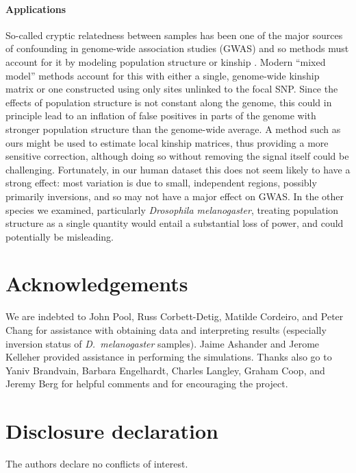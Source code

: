 \documentclass[11pt, oneside]{article}   	%
\newcommand\citep{\cite}
\renewcommand{\revpoint}[2]{\relax}
\begin{document}
\paragraph{Applications}
So-called cryptic relatedness between samples
has been one of the major sources of confounding in genome-wide association studies (GWAS)
and so methods must account for it by modeling population structure or kinship \citep{astle2009population,yang2014advantages}.
Modern ``mixed model'' methods \citep[e.g.][]{loh2015efficient} 
account for this with either a single, genome-wide kinship matrix
or one constructed using only sites unlinked to the focal SNP. %
Since the effects of population structure is not constant along the genome,
this could in principle lead to an inflation of false positives in parts of the genome
with stronger population structure than the genome-wide average.
A method such as ours might be used to estimate local kinship matrices,
thus providing a more sensitive correction,
although doing so without removing the signal itself could be challenging.
Fortunately, in our human dataset this does not seem likely to have a strong effect:
most variation is due to small, independent regions, possibly primarily inversions,
and so may not have a major effect on GWAS.
In the other species we examined, particularly \textit{Drosophila melanogaster},
treating population structure as a single quantity would entail a substantial loss of power,
and could potentially be misleading.

\section*{Acknowledgements}

We are indebted to John Pool, Russ Corbett-Detig, Matilde Cordeiro, and Peter Chang 
for assistance with obtaining data and interpreting results
(especially inversion status of \textit{D.~melanogaster} samples).
Jaime Ashander and Jerome Kelleher provided assistance in performing the simulations.
Thanks also go to Yaniv Brandvain, Barbara Engelhardt, Charles Langley, Graham Coop, and Jeremy Berg for helpful comments
and for encouraging the project.

\section*{Disclosure declaration}

The authors declare no conflicts of interest.
\end{document}
